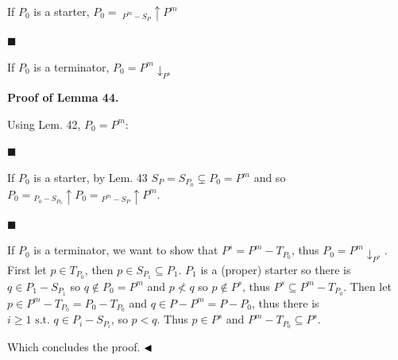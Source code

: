 \documentclass[10pt,a4paper]{article}
\begin{document}
If $P_{0}$ is a starter, $P_{0}=\ {}_{P^{m}-S_{P}\!}{\uparrow}{P^{m}}$\par
 
 
 
\par\noindent  $\blacksquare$ 
 
If $P_{0}$ is a terminator, $P_{0}={P^{m}}{\downarrow}_{P^{s}}$\par
 
 
  
 
 
 
 
\par\medskip\noindent\textbf{Proof of Lemma 44.}\par
 
 
Using Lem. 42, $P_{0}=P^{m}$:\par
  
\par\noindent  $\blacksquare$ 
 
If $P_{0}$ is a starter, by Lem. 43 $S_{P}=S_{P_{0}}\subsetneq P_{0}=P^{m}$ and so $P_{0}={}_{P_{0}-S_{P_{0}}\!}{\uparrow}{P_{0}}={}_{P^{m}-S_{P}\!}{\uparrow}{P^{m}}$.\par
 
 
 
\par\noindent  $\blacksquare$ 
 
If $P_{0}$ is a terminator, we want to show that $P^{s}=P^{m}-T_{P_{0}}$, thus $P_{0}={P^{m}}{\downarrow}_{P^{s}}$. First let $p\in T_{P_{0}}$, then $p\in S_{P_{1}}\subseteq P_{1}$. $P_{1}$ is a (proper) starter so there is $q\in P_{1}-S_{P_{1}}$ so $q\not\in P_{0}=P^{m}$ and $p\not<q$ so $p\not\in P^{s}$, thus $P^{s}\subseteq P^{m}-T_{P_{0}}$. Then let $p\in P^{m}-T_{P_{0}}=P_{0}-T_{P_{0}}$ and $q\in P-P^{m}=P-P_{0}$, thus there is $i\geqslant 1\text{ s.t.\ }q\in P_{i}-S_{P_{i}}$, so $p<q$. Thus $p\in P^{s}$ and $P^{m}-T_{P_{0}}\subseteq P^{s}$.\par
 
 
  
Which concludes the proof. $\hfill\blacktriangleleft$\par
 
\end{document}
